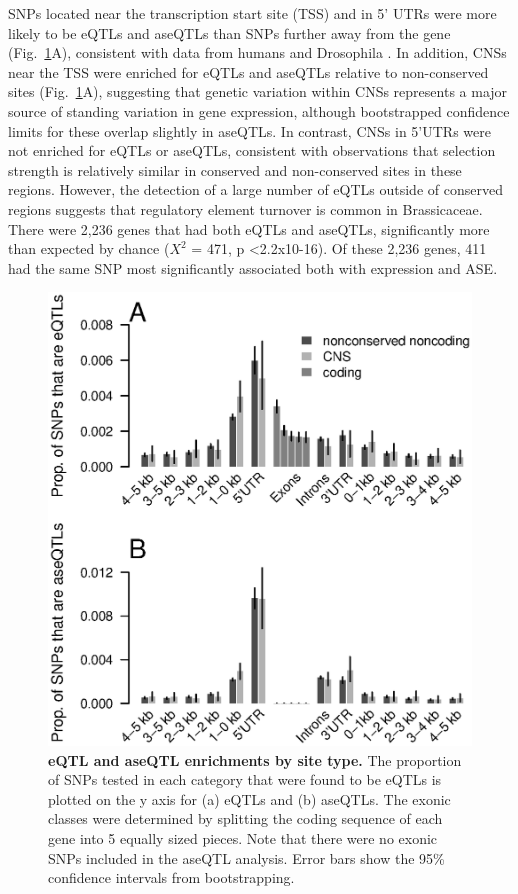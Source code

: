 SNPs located near the transcription start site (TSS) and in 5’ UTRs were more likely to be eQTLs and aseQTLs than SNPs further away from the gene (Fig.~\ref{fig:3fig2}A), consistent with data from humans and Drosophila \citep{Massouras2012-wq,Pickrell2010-ci,Battle2014-ke}. In addition, CNSs near the TSS were enriched for eQTLs and aseQTLs relative to non-conserved sites (Fig.~\ref{fig:3fig2}A), suggesting that genetic variation within CNSs represents a major source of standing variation in gene expression, although bootstrapped confidence limits for these overlap slightly in aseQTLs. In contrast, CNSs in 5’UTRs were not enriched for eQTLs or aseQTLs, consistent with observations that selection strength is relatively similar in conserved and non-conserved sites in these regions\citep{Haudry2013-qe}. However, the detection of a large number of eQTLs outside of conserved regions suggests that regulatory element turnover is common in Brassicaceae. There were 2,236 genes that had both eQTLs and aseQTLs, significantly more than expected by chance ($X^{2}$ = 471, p \textless 2.2x10-16). Of these 2,236 genes, 411 had the same SNP most significantly associated both with expression and ASE.

\begin{figure}[ht!]
      \centering
       \includegraphics[width=\linewidth]{Ch3Fig2}
    \caption{\textbf{eQTL and aseQTL enrichments by site type.} The proportion of SNPs tested in each category that were found to be eQTLs is plotted on the y axis for (a) eQTLs and (b) aseQTLs. The exonic classes were determined by splitting the coding sequence of each gene into 5 equally sized pieces. Note that there were no exonic SNPs included in the aseQTL analysis. Error bars show the 95\% confidence intervals from bootstrapping.}
    \label{fig:3fig2}
\end{figure}

